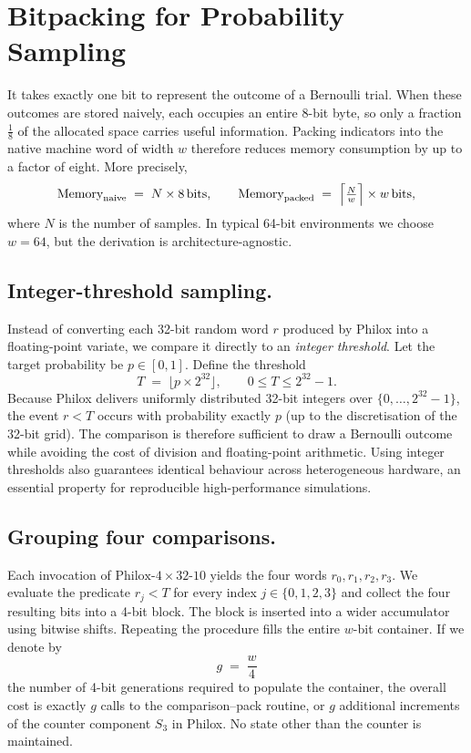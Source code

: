 \section{Bitpacking for Probability Sampling}
\label{sec:bitpack-prob-sampling}

It takes exactly one bit to represent the outcome of a Bernoulli trial. When these outcomes are stored naively, each occupies an entire \(8\)-bit byte, so only a fraction \(\tfrac{1}{8}\) of the allocated space carries useful information. Packing indicators into the native machine word of width \(w\) therefore reduces memory consumption by up to a factor of eight. More precisely,
\[
  \text{Memory}_{\text{naive}} \;=\; N \times 8\,\text{bits},
  \qquad
  \text{Memory}_{\text{packed}} \;=\;\Bigl\lceil\tfrac{N}{w}\Bigr\rceil \times w\,\text{bits},
\]
where \(N\) is the number of samples. In typical 64-bit environments we choose \(w = 64\), but the derivation is architecture-agnostic.

\subsection{Integer-threshold sampling.}  Instead of converting each 32-bit random word \(r\) produced by Philox into a floating-point variate, we compare it directly to an \emph{integer threshold}.  Let the target probability be \(p \in [0,1]\).  Define the threshold
\[
   T \;=\; \bigl\lfloor p \times 2^{32} \bigr\rfloor,\qquad 0 \le T \le 2^{32}-1.
\]
Because Philox delivers uniformly distributed 32-bit integers over \(\{0,\dots,2^{32}-1\}\), the event \(r < T\) occurs with probability exactly \(p\) (up to the discretisation of the 32-bit grid).  The comparison is therefore sufficient to draw a Bernoulli outcome while avoiding the cost of division and floating-point arithmetic.  Using integer thresholds also guarantees identical behaviour across heterogeneous hardware, an essential property for reproducible high-performance simulations.

\subsection{Grouping four comparisons.}  Each invocation of \(\mathrm{Philox\text{-}4\times32\text{-}10}\) yields the four words \(r_0, r_1, r_2, r_3\).  We evaluate the predicate \(r_j < T\) for every index \(j \in \{0,1,2,3\}\) and collect the four resulting bits into a 4-bit block.  The block is inserted into a wider accumulator using bitwise shifts.  Repeating the procedure fills the entire \(w\)-bit container.  If we denote by
\[
   g \;=\; \frac{w}{4}
\]
 the number of 4-bit generations required to populate the container, the overall cost is exactly \(g\) calls to the comparison–pack routine, or \(g\) additional increments of the counter component \(S_3\) in Philox.  No state other than the counter is maintained.

